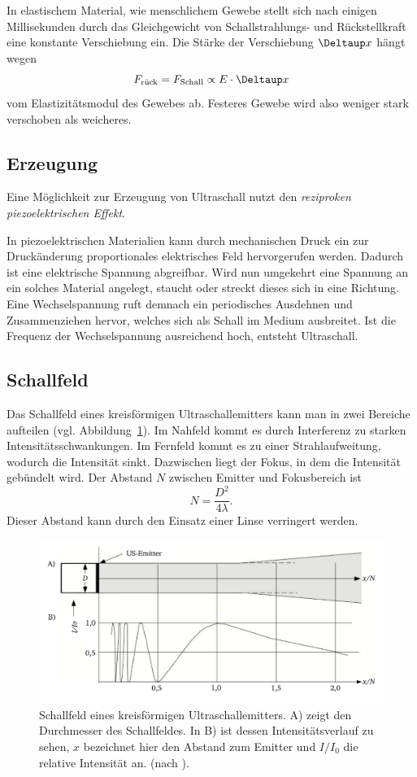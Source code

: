 \documentclass[
    11pt,
    ngerman
]{scrreprt}
\begin{document}
In elastischem Material, wie menschlichem Gewebe stellt sich nach einigen Millisekunden durch das Gleichgewicht von Schallstrahlungs- und Rückstellkraft  eine konstante Verschiebung ein. Die Stärke der Verschiebung $\Deltaup x$ hängt wegen 
\[
    F_\text{rück} = F_\text{Schall} \propto E\cdot\Deltaup x
\]
vom Elastizitätsmodul des Gewebes ab. Festeres Gewebe wird also weniger stark verschoben als weicheres.


\subsection{Erzeugung}

Eine Möglichkeit zur Erzeugung von Ultraschall nutzt den
\emph{reziproken piezoelektrischen Effekt}.

In piezoelektrischen Materialien kann durch mechanischen Druck ein zur
Druckänderung proportionales elektrisches Feld hervorgerufen werden. Dadurch
ist eine elektrische Spannung abgreifbar. Wird nun umgekehrt eine Spannung an
ein solches Material angelegt, staucht oder streckt dieses sich in eine
Richtung. Eine Wechselspannung ruft demnach ein periodisches Ausdehnen und
Zusammenziehen hervor, welches sich als Schall im Medium ausbreitet. Ist die
Frequenz der Wechselspannung ausreichend hoch, entsteht Ultraschall.

\subsection{Schallfeld}

Das Schallfeld eines kreisförmigen Ultraschallemitters kann man in zwei Bereiche aufteilen (vgl. Abbildung~\ref{fig:us-feld}). Im Nahfeld kommt es durch Interferenz zu starken Intensitätsschwankungen. Im Fernfeld kommt es zu einer Strahlaufweitung, wodurch die Intensität sinkt. Dazwischen liegt der Fokus, in dem die Intensität gebündelt wird. Der Abstand $N$ zwischen Emitter und Fokusbereich ist
\[
    N = \frac{D^2}{4\lambda}.
\]
Dieser Abstand kann durch den Einsatz einer Linse verringert werden.

\begin{figure}[htbp]
    \centering
    \includegraphics[width=.8\textwidth]{Abbildungen/US_Feld.pdf}
    \caption{%
        Schallfeld eines kreisförmigen Ultraschallemitters. A) zeigt den Durchmesser des Schallfeldes. In B) ist dessen Intensitätsverlauf zu sehen, $x$ bezeichnet hier den Abstand zum Emitter und $I/I_0$ die relative Intensität an. (nach \parencite{bildgebende_verfahren}).
    }
    \label{fig:us-feld}
\end{figure}
\end{document}
